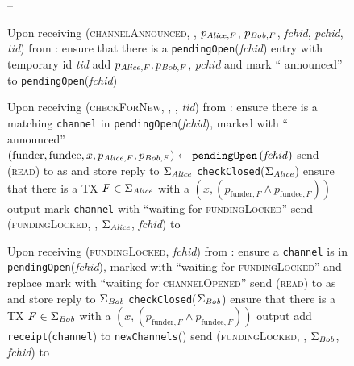   \begin{figure}[H]
    \begin{systembox}{\fpaynet{} -- }
      \begin{algorithmic}[1]
        \State Upon receiving (\textsc{channelAnnounced}, \alice, $p_{\mathit{Alice},
        F}$, $p_{\mathit{Bob}, F}$, \textit{fchid}, \textit{pchid}, \textit{tid}) from
        \simulator:
        \Indent
          \State ensure that there is a \texttt{pendingOpen}(\textit{fchid})
          entry with temporary id \textit{tid}
          \label{alg:fpaynet:announced:valid}
          \State add $p_{\mathit{Alice}, F}, p_{\mathit{Bob}, F}$, \textit{pchid} and  mark
          ``\alice{} announced'' to \texttt{pendingOpen}(\textit{fchid})
          \label{alg:fpaynet:announced:add}
        \EndIndent
        \Statex

        \State Upon receiving (\textsc{checkForNew}, \alice, \bob, \textit{tid})
        from \alice:
        \Indent
          \State ensure there is a matching \texttt{channel} in
          \texttt{pendingOpen}(\textit{fchid}), marked with ``\alice{}
          announced''
          \label{alg:fpaynet:checkForNew:valid}
          \State $\left(\mathrm{funder}, \mathrm{fundee}, x, p_{\mathit{Alice}, F},
          p_{\mathit{Bob}, F}\right) \gets
          \mathtt{pendingOpen}\left(\mathit{fchid}\right)$
          \State send (\textsc{read}) to \ledger{} as \alice{} and store reply
          to $\Sigma_{\mathit{Alice}}$
          \State \texttt{checkClosed}($\Sigma_{\mathit{Alice}}$)
          \label{alg:fpaynet:checkForNew:read:alice}
          \State ensure that there is a TX $F \in \Sigma_{\mathit{Alice}}$ with a
          $\left(x, \left(p_{\mathrm{funder}, F} \wedge p_{\mathrm{fundee},
          F}\right)\right)$ output
          \label{alg:fpaynet:checkForNew:included}
          \State mark \texttt{channel} with ``waiting for
          \textsc{fundingLocked}''
          \label{alg:fpaynet:checkForNew:mark}
          \State send (\textsc{fundingLocked}, \alice, $\Sigma_{\mathit{Alice}}$,
          \textit{fchid}) to \simulator
          \label{alg:fpaynet:checkForNew:sim}
        \EndIndent
        \Statex

        \State Upon receiving (\textsc{fundingLocked}, \textit{fchid}) from
        \simulator:
        \Indent
          \State ensure a \texttt{channel} is in
          \texttt{pendingOpen}(\textit{fchid}), marked with ``waiting for
          \textsc{fundingLocked}'' and replace mark with ``waiting for
          \textsc{channelOpened}''
          \State send (\textsc{read}) to \ledger{} as \bob{} and store reply
          to $\Sigma_{\mathit{Bob}}$
          \State \texttt{checkClosed}($\Sigma_{\mathit{Bob}}$)
          \label{alg:fpaynet:checkForNew:read:bob}
          \State ensure that there is a TX $F \in \Sigma_{\mathit{Bob}}$ with a
          $\left(x, \left(p_{\mathrm{funder}, F} \wedge p_{\mathrm{fundee},
          F}\right)\right)$ output
          \State add \texttt{receipt}(\texttt{channel}) to
          \texttt{newChannels}(\bob)
          \label{alg:fpaynet:fundingLocked:report}
          \State send (\textsc{fundingLocked}, \bob, $\Sigma_{\mathit{Bob}}$,
          \textit{fchid}) to \simulator
          \label{alg:fpaynet:fundingLocked:sim}
        \EndIndent
        \Statex


\end{algorithmic}
\end{systembox}
\end{figure}
